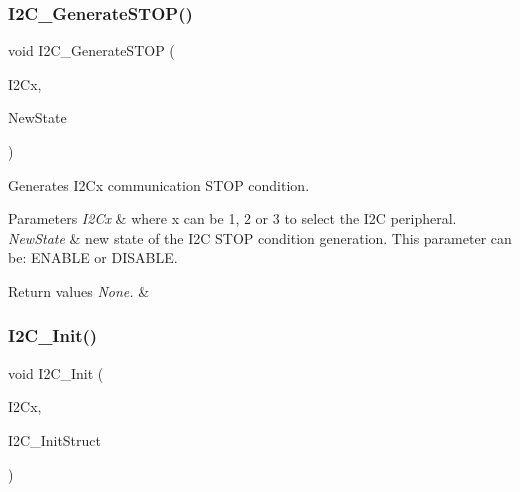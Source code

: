\subsubsection{\texorpdfstring{I2\+C\+\_\+\+Generate\+S\+T\+O\+P()}{I2C\_GenerateSTOP()}}
{\footnotesize\ttfamily void I2\+C\+\_\+\+Generate\+S\+T\+OP (\begin{DoxyParamCaption}\item[{I2\+C\+\_\+\+Type\+Def $\ast$}]{I2\+Cx,  }\item[{Functional\+State}]{New\+State }\end{DoxyParamCaption})}



Generates I2\+Cx communication S\+T\+OP condition. 


\begin{DoxyParams}{Parameters}
{\em I2\+Cx} & where x can be 1, 2 or 3 to select the I2C peripheral. \\
\hline
{\em New\+State} & new state of the I2C S\+T\+OP condition generation. This parameter can be\+: E\+N\+A\+B\+LE or D\+I\+S\+A\+B\+LE. \\
\hline
\end{DoxyParams}

\begin{DoxyRetVals}{Return values}
{\em None.} & \\
\hline
\end{DoxyRetVals}
\mbox{\label{group___i2_c___group1_gaac29465bca70fbc91c2f922ab67bb88e}} 
\subsubsection{\texorpdfstring{I2\+C\+\_\+\+Init()}{I2C\_Init()}}
{\footnotesize\ttfamily void I2\+C\+\_\+\+Init (\begin{DoxyParamCaption}\item[{I2\+C\+\_\+\+Type\+Def $\ast$}]{I2\+Cx,  }\item[{\mbox{\hyperlink{struct_i2_c___init_type_def}{I2\+C\+\_\+\+Init\+Type\+Def}} $\ast$}]{I2\+C\+\_\+\+Init\+Struct }\end{DoxyParamCaption})}



